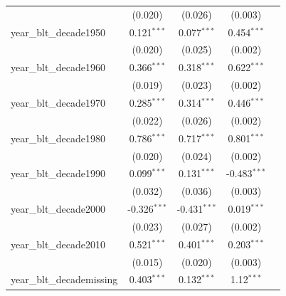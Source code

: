 \documentclass[
  11pt,
]{article}
\begin{document}
\begin{center}
{\begin{tabular}{lcccc}
                                                               & (0.020)        & (0.026)        & (0.003)        &   \\   
   year\_blt\_decade1950                                       & 0.121$^{***}$  & 0.077$^{***}$  & 0.454$^{***}$  &   \\   
                                                               & (0.020)        & (0.025)        & (0.002)        &   \\   
   year\_blt\_decade1960                                       & 0.366$^{***}$  & 0.318$^{***}$  & 0.622$^{***}$  &   \\   
                                                               & (0.019)        & (0.023)        & (0.002)        &   \\   
   year\_blt\_decade1970                                       & 0.285$^{***}$  & 0.314$^{***}$  & 0.446$^{***}$  &   \\   
                                                               & (0.022)        & (0.026)        & (0.002)        &   \\   
   year\_blt\_decade1980                                       & 0.786$^{***}$  & 0.717$^{***}$  & 0.801$^{***}$  &   \\   
                                                               & (0.020)        & (0.024)        & (0.002)        &   \\   
   year\_blt\_decade1990                                       & 0.099$^{***}$  & 0.131$^{***}$  & -0.483$^{***}$ &   \\   
                                                               & (0.032)        & (0.036)        & (0.003)        &   \\   
   year\_blt\_decade2000                                       & -0.326$^{***}$ & -0.431$^{***}$ & 0.019$^{***}$  &   \\   
                                                               & (0.023)        & (0.027)        & (0.002)        &   \\   
   year\_blt\_decade2010                                       & 0.521$^{***}$  & 0.401$^{***}$  & 0.203$^{***}$  &   \\   
                                                               & (0.015)        & (0.020)        & (0.003)        &   \\   
   year\_blt\_decademissing                                    & 0.403$^{***}$  & 0.132$^{***}$  & 1.12$^{***}$   &   \\   

\end{tabular}}
\end{center}
\end{document}
